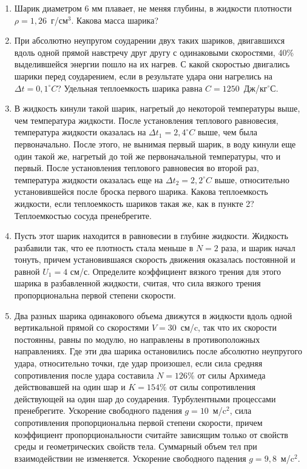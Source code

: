 
\begin{enumerate}
    \item Шарик диаметром 6 мм плавает, не меняя глубины, в жидкости плотности $\rho=1,26$~г/см$^3$. Какова масса шарика?
    \item При абсолютно неупругом соударении двух таких шариков, двигавшихся вдоль одной прямой навстречу друг другу с одинаковыми скоростями, 
    40\% выделившейся энергии пошло на их нагрев. С какой скоростью двигались шарики перед соударением, если в результате удара они нагрелись на 
    $\Delta t = 0,1^{\circ}C$? Удельная теплоемкость шарика равна $C=1250$~Дж/кг$^{\circ}$С.
    \item В жидкость кинули такой шарик, нагретый до некоторой температуры выше, чем температура жидкости. После установления теплового 
    равновесия, температура жидкости оказалась на $\Delta t_1 = 2,4^{\circ}C$ выше, чем была первоначально. После этого, не вынимая первый 
    шарик, в воду кинули еще один такой же, нагретый до той же первоначальной температуры, что и первый. После установления теплового 
    равновесия во второй раз, температура жидкости оказалась еще на $\Delta t_2 = 2,2^{\circ}C$ выше, относительно установившейся 
    после броска первого шарика. Какова теплоемкость жидкости, если теплоемкость шариков такая же, как в пункте 2? 
    Теплоемкостью сосуда пренебрегите.
    \item Пусть этот шарик находится в равновесии в глубине жидкости. Жидкость разбавили так, что ее плотность 
    стала меньше в $N = 2$ раза, и шарик начал тонуть, причем установившаяся скорость движения оказалась постоянной и равной $U_1 = 4$ см/с. Определите коэффициент вязкого трения для этого шарика в разбавленной жидкости, 
    считая, что сила вязкого трения пропорциональна первой степени скорости.
    \item Два разных шарика одинакового объема движутся в жидкости вдоль одной вертикальной прямой со скоростями 
    $V = 30$~см/c, так что их скорости постоянны, равны по модулю, но направлены в противоположных направлениях. 
    Где эти два шарика остановились после абсолютно неупругого удара, относительно точки, где удар произошел, 
    если сила средняя сопротивления после удара составила $N = 126\%$ от силы Архимеда действовавшей на один шар и 
    $K = 154\%$ от силы сопротивления действующей на один шар до соударения. Турбулентными процессами пренебрегите. 
    Ускорение свободного падения $g = 10$~м/c$^2$, сила сопротивления пропорциональна первой степени скорости, 
    причем коэффициент пропорциональности считайте зависящим только от свойств среды и геометрических свойств 
    тела. Суммарный объем тел при взаимодействии не изменяется. Ускорение свободного падения $g=9,8$~м/c$^2$.   
\end{enumerate}

